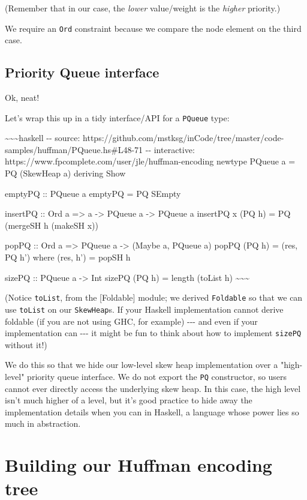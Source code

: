 \documentclass[]{article}
\begin{document}
(Remember that in our case, the \emph{lower} value/weight is the \emph{higher}
priority.)

We require an \texttt{Ord} constraint because we compare the node element on the
third case.

\subsection{Priority Queue interface}

Ok, neat!

Let's wrap this up in a tidy interface/API for a \texttt{PQueue} type:

\textasciitilde{}\textasciitilde{}\textasciitilde{}haskell -\/- source:
https://github.com/mstksg/inCode/tree/master/code-samples/huffman/PQueue.hs\#L48-71
-\/- interactive: https://www.fpcomplete.com/user/jle/huffman-encoding newtype
PQueue a = PQ (SkewHeap a) deriving Show

emptyPQ :: PQueue a emptyPQ = PQ SEmpty

insertPQ :: Ord a =\textgreater{} a -\textgreater{} PQueue a -\textgreater{}
PQueue a insertPQ x (PQ h) = PQ (mergeSH h (makeSH x))

popPQ :: Ord a =\textgreater{} PQueue a -\textgreater{} (Maybe a, PQueue a)
popPQ (PQ h) = (res, PQ h') where (res, h') = popSH h

sizePQ :: PQueue a -\textgreater{} Int sizePQ (PQ h) = length (toList h)
\textasciitilde{}\textasciitilde{}\textasciitilde{}

(Notice \texttt{toList}, from the {[}Foldable{]} module; we derived
\texttt{Foldable} so that we can use \texttt{toList} on our \texttt{SkewHeap}s.
If your Haskell implementation cannot derive foldable (if you are not using GHC,
for example) -\/-\/- and even if your implementation can -\/-\/- it might be fun
to think about how to implement \texttt{sizePQ} without it!)

We do this so that we hide our low-level skew heap implementation over a
"high-level" priority queue interface. We do not export the \texttt{PQ}
constructor, so users cannot ever directly access the underlying skew heap. In
this case, the high level isn't much higher of a level, but it's good practice
to hide away the implementation details when you can in Haskell, a language
whose power lies so much in abstraction.

\section{Building our Huffman encoding tree}
\end{document}
